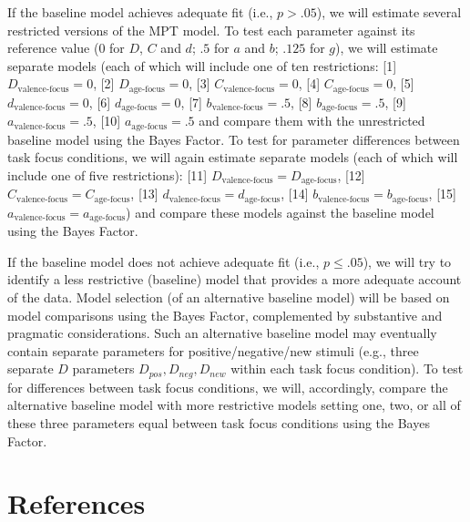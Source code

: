 \documentclass[
  doc,floatsintext]{apa6}
\begin{document}
If the baseline model achieves adequate fit (i.e., \(p > .05\)),
we will estimate several restricted versions of the MPT model.
To test each parameter against its reference value (\(0\) for \(D\), \(C\) and \(d\); \(.5\) for \(a\) and \(b\); \(.125\) for \(g\)),
we will estimate separate models (each of which will include one of ten restrictions:
{[}1{]} \(D_\textrm{valence-focus}=0\),
{[}2{]} \(D_\textrm{age-focus}=0\),
{[}3{]} \(C_\textrm{valence-focus}=0\),
{[}4{]} \(C_\textrm{age-focus}=0\),
{[}5{]} \(d_\textrm{valence-focus}=0\),
{[}6{]} \(d_\textrm{age-focus}=0\),
{[}7{]} \(b_\textrm{valence-focus}=.5\),
{[}8{]} \(b_\textrm{age-focus}=.5\),
{[}9{]} \(a_\textrm{valence-focus}=.5\),
{[}10{]} \(a_\textrm{age-focus}=.5\)
and compare them with the unrestricted baseline model using the Bayes Factor.
To test for parameter differences between task focus conditions,
we will again estimate separate models (each of which will include one of five restrictions):
{[}11{]} \(D_\textrm{valence-focus}=D_\textrm{age-focus}\),
{[}12{]} \(C_\textrm{valence-focus}=C_\textrm{age-focus}\),
{[}13{]} \(d_\textrm{valence-focus}=d_\textrm{age-focus}\),
{[}14{]} \(b_\textrm{valence-focus}=b_\textrm{age-focus}\),
{[}15{]} \(a_\textrm{valence-focus}=a_\textrm{age-focus}\))
and compare these models against the baseline model using the Bayes Factor.

If the baseline model does not achieve adequate fit (i.e., \(p \leq .05\)),
we will try to identify a less restrictive (baseline) model that provides a more adequate account of the data.
Model selection (of an alternative baseline model) will be based on model comparisons using the Bayes Factor,
complemented by substantive and pragmatic considerations.
Such an alternative baseline model may eventually contain separate parameters for positive/negative/new stimuli (e.g., three separate \(D\) parameters \(D_\textit{pos}, D_\textit{neg}, D_\textit{new}\) within each task focus condition).
To test for differences between task focus conditions,
we will, accordingly, compare the alternative baseline model with more restrictive models setting one, two, or all of these three parameters equal between task focus conditions using the Bayes Factor.

\section{References}\label{references}
\end{document}
